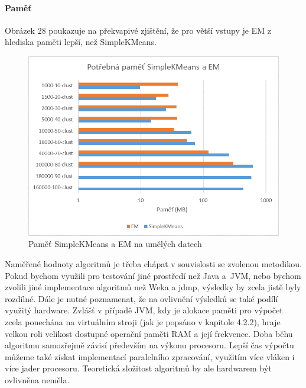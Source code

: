 \documentclass[12pt]{article}
\begin{document}
\newpage
\paragraph{Paměť}
Obrázek 28 poukazuje na překvapivé zjištění, že pro větší vstupy je EM z hlediska paměti lepší, než SimpleKMeans.
\begin{figure}[hbp]
  \centering
  \includegraphics[scale=1]{img/genclustmem.png}
  \caption{Paměť SimpleKMeans a EM na umělých datech}
\end{figure}


Naměřené hodnoty algoritmů je třeba chápat v souvislosti se zvolenou metodikou. Pokud bychom využili pro testování jiné prostředí než Java a~JVM, nebo bychom zvolili jiné implementace algoritmů než Weka a jdmp, výsledky by zcela jistě byly rozdílné. Dále je nutné poznamenat, že  na ovlivnění výsledků se také podílí využitý hardware. Zvlášť v případě JVM, kdy je alokace paměti pro výpočet zcela ponechána na virtuálním stroji (jak je popsáno v kapitole 4.2.2), hraje velkou roli velikost dostupné operační paměti RAM a její frekvence. Doba běhu algoritmu samozřejmě závisí především na výkonu procesoru. Lepší čas výpočtu můžeme také získat implementací paralelního zpracování, využitím více vláken i více jader procesoru. Teoretická složitost algoritmů by ale hardwarem být ovlivněna neměla. 
\end{document}
